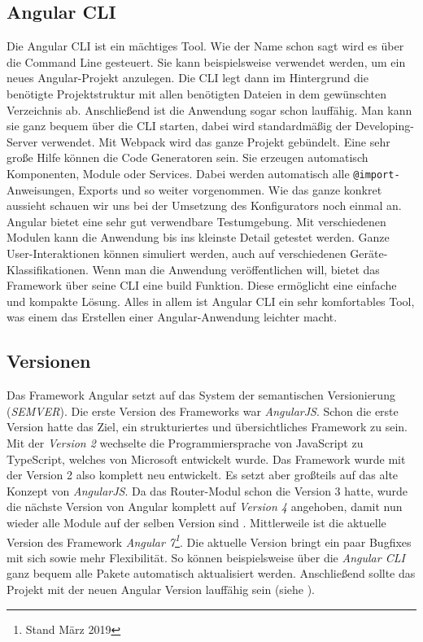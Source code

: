 \subsection{Angular CLI}
Die Angular CLI ist ein mächtiges Tool. Wie der Name schon sagt wird es über die Command Line gesteuert. Sie kann beispielsweise verwendet werden, um ein neues Angular-Projekt anzulegen. Die CLI legt dann im Hintergrund die benötigte Projektstruktur mit allen benötigten Dateien in dem gewünschten Verzeichnis ab. Anschließend ist die Anwendung sogar schon lauffähig. Man kann sie ganz bequem über die CLI starten, dabei wird standardmäßig der Developing-Server verwendet. Mit Webpack wird das ganze Projekt gebündelt. Eine sehr große Hilfe können die Code Generatoren sein. Sie erzeugen automatisch Komponenten, Module oder Services. Dabei werden automatisch alle \texttt{@import-}Anweisungen, Exports und so weiter vorgenommen. Wie das ganze konkret aussieht schauen wir uns bei der Umsetzung des Konfigurators noch einmal an. Angular bietet eine sehr gut verwendbare Testumgebung. Mit verschiedenen Modulen kann die Anwendung bis ins kleinste Detail getestet werden. Ganze User-Interaktionen können simuliert werden, auch auf verschiedenen Geräte-Klassifikationen. Wenn man die Anwendung veröffentlichen will, bietet das Framework über seine CLI eine build Funktion. Diese ermöglicht eine einfache und kompakte Lösung. Alles in allem ist Angular CLI ein sehr komfortables Tool, was einem das Erstellen einer Angular-Anwendung leichter macht.
%
\subsection{Versionen}
Das Framework Angular setzt auf das System der semantischen Versionierung (\textit{SEMVER}). Die erste Version des Frameworks war \textit{AngularJS}. Schon die erste Version hatte das Ziel, ein strukturiertes und übersichtliches Framework zu sein. Mit der \textit{Version 2} wechselte die Programmiersprache von JavaScript zu TypeScript, welches von Microsoft entwickelt wurde. Das Framework wurde mit der Version 2 also komplett neu entwickelt. Es setzt aber großteils auf das alte Konzept von \textit{AngularJS}. Da das Router-Modul schon die Version 3 hatte, wurde die nächste Version von Angular komplett auf \textit{Version 4} angehoben, damit nun wieder alle Module auf der selben Version sind \cite{bohm_robin_angular_2017}. Mittlerweile ist die aktuelle Version des Framework \textit{Angular 7\footnote{Stand März 2019}}. Die aktuelle Version bringt ein paar Bugfixes mit sich sowie mehr Flexibilität. So können beispielsweise über die \textit{Angular CLI} ganz bequem alle Pakete automatisch aktualisiert werden. Anschließend sollte das Projekt mit der neuen Angular Version lauffähig sein (siehe \cite{steyer_ruhe_2018}).
%
%
%
%
%
